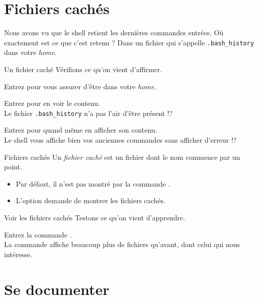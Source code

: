 \documentclass[a4paper,11pt]{style-esi/td}
\begin{document}
\section{Fichiers cachés}

	Nous avons vu que le shell retient les dernières commandes entrées.
	Où exactement est ce que c'est retenu ?
	Dans un fichier qui s'appelle \verb|.bash_history| dans votre \emph{home}.

	\begin{Experience}{Un fichier caché}
		Vérifions ce qu'on vient d'affirmer.
		\begin{steps}
		\item Entrez  pour vous assurer d'être dans votre \emph{home}.
		\item Entrez  pour en voir le contenu.
			\\Le fichier \verb|.bash_history| n'a pas l'air d'être présent !?
		\item Entrez  pour quand même en afficher son contenu.
			\\Le shell vous affiche bien vos anciennes commandes sans afficher d'erreur !?
		\end{steps}
	\end{Experience}

	\medskip
	\begin{theorie}{Fichiers cachés}
		Un \emph{fichier caché} 
		est un fichier dont le nom commence par un point.
		\begin{itemize}
		\item Par défaut, il n'est pas montré par la commande \kbd{ls}.
		\item L'option  demande de montrer les fichiers cachés.
		\end{itemize}
	\end{theorie}

	\begin{Experience}{Voir les fichiers cachés}
		Testons ce qu'on vient d'apprendre.
		\begin{steps}
		\item Entrez la commande \kbd{ls -a}.
			\\La commande affiche beaucoup plus de fichiers qu'avant,
			dont celui qui nous intéresse.
		\end{steps}
	\end{Experience}

\section{Se documenter}
\end{document}
